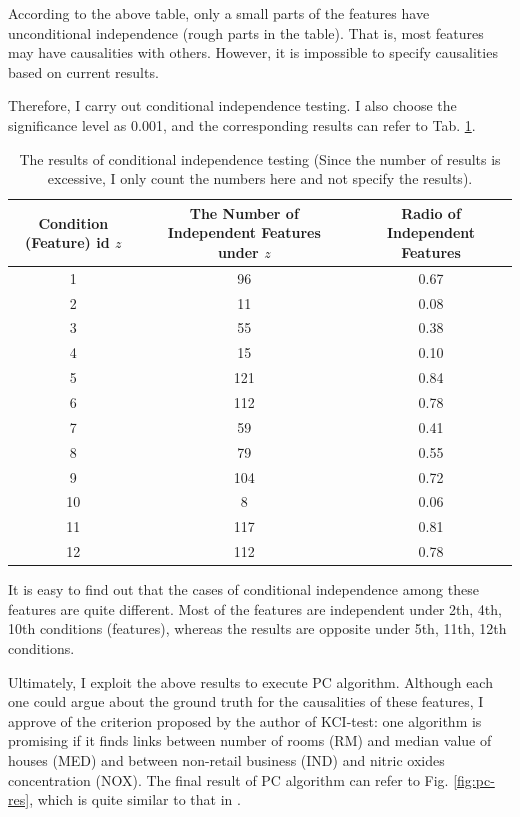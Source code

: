 \documentclass[12pt,a4paper]{article}
\theoremstyle{definition}
\begin{document}
According to the above table, only a small parts of the features have unconditional independence (rough parts in the table). That is, most features may have causalities with others. However, it is impossible to specify causalities based on current results.

Therefore, I carry out conditional independence testing. I also choose the significance level as 0.001, and the corresponding results can refer to Tab. \ref{tab:con-in}.

\begin{table}[H]
	\renewcommand\arraystretch{1.35}
	\caption{The results of conditional independence testing (Since the number of results is excessive, I only count the numbers here and not specify the results).}
	\label{tab:con-in}
	\centering
	
	\begin{tabular}{c|c|c}
		\centering
		Condition (Feature) id $z$ & The Number of Independent Features under $z$ & Radio of Independent Features \\
		\hline
		1 & 96 & 0.67 \\
		\hline
		2 & 11 & 0.08 \\
		\hline
		3 & 55 & 0.38 \\
		\hline
		4 & 15 & 0.10 \\
		\hline
		5 & 121 & 0.84 \\
		\hline
		6 & 112 & 0.78 \\
		\hline
		7 & 59 & 0.41 \\
		\hline
		8 & 79 & 0.55 \\
		\hline
		9 & 104 & 0.72 \\
		\hline
		10 & 8 & 0.06 \\
		\hline
		11 & 117 & 0.81 \\
		\hline
		12 & 112 & 0.78 \\
	\end{tabular}
\end{table}

It is easy to find out that the cases of conditional independence among these features are quite different. Most of the features are independent under 2th, 4th, 10th conditions (features), whereas the results are opposite under 5th, 11th, 12th conditions.

Ultimately, I exploit the above results to execute PC algorithm. Although each one could argue about the ground truth for the causalities of these features, I approve of the criterion proposed by the author of KCI-test: one algorithm is promising if it finds links between number of rooms (RM) and median value of houses (MED) and between non-retail business (IND) and nitric oxides concentration (NOX). The final result of PC algorithm can refer to Fig. \ref{fig:pc-res}, which is quite similar to that in \cite{alg}.
\end{document}
